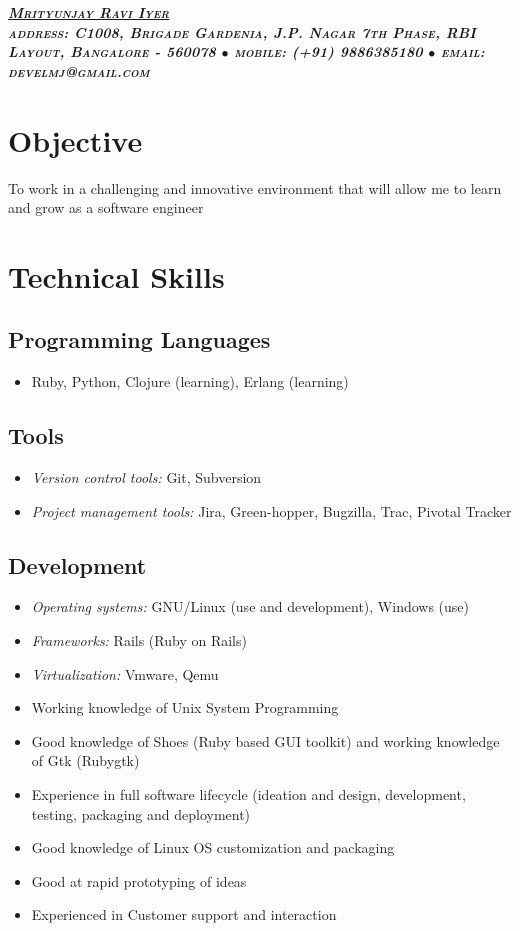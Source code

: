 \documentclass[a4paper,12pt]{article}
\begin{document}
\begin{center}{\Large{\textsc{\textsl{\bf{\underline{Mrityunjay Ravi
          Iyer}}\\\tiny{address: C1008, Brigade Gardenia, J.P. Nagar 7th Phase,
          RBI Layout, Bangalore - 560078 $\bullet$ mobile: (+91) 9886385180
          $\bullet$ email: develmj@gmail.com}}}}}
\end{center}
\section{Objective}
To work in a challenging and innovative environment that will allow me
to learn and grow as a software engineer

\section{Technical Skills}
\subsection{Programming Languages}
\begin{itemize}
  \item[] Ruby, Python, Clojure (learning), Erlang (learning)
\end{itemize}

\subsection{Tools}
\begin{itemize}
  \item[] \textsl{Version control tools:} Git, Subversion
  \item[] \textsl{Project management tools:} Jira, Green-hopper, Bugzilla, Trac,
    Pivotal Tracker
\end{itemize}

\subsection{Development}
\begin{itemize}
  \item[] \textsl{Operating systems:} GNU/Linux (use and development),
    Windows (use)
  \item[] \textsl{Frameworks:} Rails (Ruby on Rails)
  \item[] \textsl{Virtualization:} Vmware, Qemu
  \item[] Working knowledge of Unix System Programming
  \item[] Good knowledge of Shoes (Ruby based GUI toolkit) and working
    knowledge of Gtk (Rubygtk)
  \item[] Experience in full software lifecycle (ideation and design,
 development, testing, packaging and deployment)
  \item[] Good knowledge of Linux OS customization and packaging
  \item[] Good at rapid prototyping of ideas
  \item[] Experienced in Customer support and interaction
\end{itemize}
\end{document}
